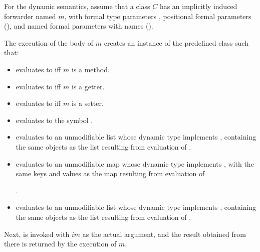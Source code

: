 \documentclass[makeidx]{article}
\begin{document}
\LMHash{}%
%
For the dynamic semantics,
assume that a class $C$ has an implicitly induced
 forwarder named $m$,
with formal type parameters
,
positional formal parameters
%
(),
and named formal parameters with names
().


\LMHash{}%
The execution of the body of $m$ creates
an instance  of the predefined class 
such that:

\begin{itemize}
\item {} evaluates to \TRUE{} if{}f $m$ is a method.
\item {} evaluates to \TRUE{} if{}f $m$ is a getter.
\item {} evaluates to \TRUE{} if{}f $m$ is a setter.
\item {} evaluates to the symbol .
\item {} evaluates to an unmodifiable list
  whose dynamic type implements ,
  containing the same objects as the list resulting from evaluation of
  .
\item {} evaluates to an unmodifiable map
  whose dynamic type implements ,
  with the same keys and values as the map resulting from evaluation of

  .
\item {} evaluates to an unmodifiable list
  whose dynamic type implements ,
  containing the same objects as the list resulting from evaluation of
  .
\end{itemize}

\LMHash{}%
Next,  is invoked with $im$ as the actual argument,
and the result obtained from there is returned by the execution of $m$.
\end{document}
